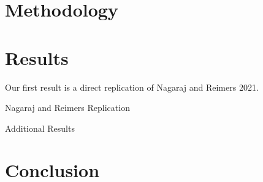 \documentclass{article}
\begin{document}
\section{Methodology}

\section{Results}

Our first result is a direct replication of Nagaraj and Reimers 2021. 
\begin{table}[htbp]
   \centering
   \caption{Nagaraj and Reimers Replication}
  
   \label{tab:booktabs}
\end{table}

\begin{table}[htbp]
   \centering
   \caption{Additional Results}
  
   \label{tab:booktabs}
\end{table}





\section{Conclusion}
\end{document}
